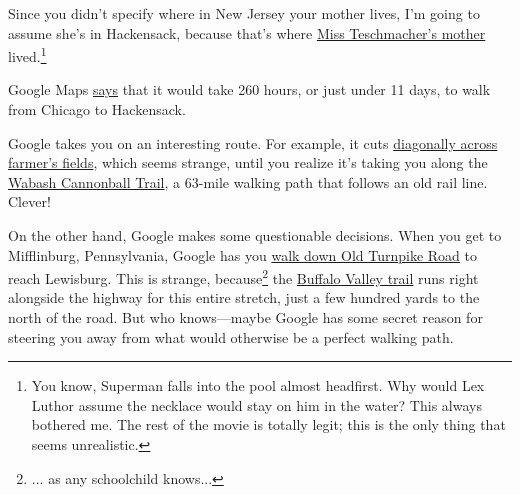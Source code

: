 {{Since you didn't specify where in New Jersey your mother lives, I'm going to assume she's in Hackensack, because that's where \href{https://www.youtube.com/watch?v=uN-tonQMgHc}{Miss Teschmacher's mother} lived.{\footnote{You know, Superman falls into the pool almost headfirst. Why would Lex Luthor assume the necklace would stay on him in the water? This always bothered me. The rest of the movie is totally legit; this is the only thing that seems unrealistic.} } }

{Google Maps \href{https://www.google.com/maps/dir/Chicago,+IL/Hackensack,+NJ/@41.009593,-89.6628229,5z/data=!4m19!4m18!1m10!1m1!1s0x880e2c3cd0f4cbed:0xafe0a6ad09c0c000!2m2!1d-87.6297982!2d41.8781136!3m4!1m2!1d-80.6378602!2d41.237811!3s0x8833dd49a12b0ac9:0x2efab33dfb2087f6!1m5!1m1!1s0x89c2fa1bb7efde49:0x420aad8868dd16d7!2m2!1d-74.0434736!2d40.8859325!3e2}{says} that it would take 260 hours, or just under 11 days, to walk from Chicago to Hackensack.}

{Google takes you on an interesting route. For example, it cuts \href{https://www.google.com/maps/dir/Chicago,+IL/Hackensack,+NJ/@41.5606636,-84.2575496,13z/data=!4m19!4m18!1m10!1m1!1s0x880e2c3cd0f4cbed:0xafe0a6ad09c0c000!2m2!1d-87.6297982!2d41.8781136!3m4!1m2!1d-80.6378602!2d41.237811!3s0x8833dd49a12b0ac9:0x2efab33dfb2087f6!1m5!1m1!1s0x89c2fa1bb7efde49:0x420aad8868dd16d7!2m2!1d-74.0434736!2d40.8859325!3e2}{diagonally across farmer's fields}, which seems strange, until you realize it's taking you along the \href{http://wabashcannonballtrail.org/} {Wabash Cannonball Trail}, a 63-mile walking path that follows an old rail line. Clever!}

{On the other hand, Google makes some questionable decisions. When you get to Mifflinburg, Pennsylvania, Google has you \href{https://www.google.com/maps/dir/Chicago,+IL/Hackensack,+NJ/@40.9449167,-76.9704374,16535m/data=!3m1!1e3!4m19!4m18!1m10!1m1!1s0x880e2c3cd0f4cbed:0xafe0a6ad09c0c000!2m2!1d-87.6297982!2d41.8781136!3m4!1m2!1d-80.6378602!2d41.237811!3s0x8833dd49a12b0ac9:0x2efab33dfb2087f6!1m5!1m1!1s0x89c2fa1bb7efde49:0x420aad8868dd16d7!2m2!1d-74.0434736!2d40.8859325!3e2}{walk down Old Turnpike Road} to reach Lewisburg. This is strange, because{\footnote{... as any schoolchild knows...} } the \href{http://www.bvrt.org/}{Buffalo Valley trail} runs right alongside the highway for this entire stretch, just a few hundred yards to the north of the road. But who knows—maybe Google has some secret reason for steering you away from what would otherwise be a perfect walking path.}

}
